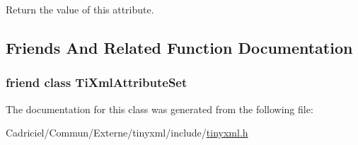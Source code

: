 Return the value of this attribute. 



\subsection{Friends And Related Function Documentation}
\hypertarget{class_ti_xml_attribute_a35a7b7f89f708527677d5078d41ce0bf}{
\subsubsection[{Ti\-Xml\-Attribute\-Set}]{\setlength{\rightskip}{0pt plus 5cm}friend class {\bf Ti\-Xml\-Attribute\-Set}\hspace{0.3cm}{\ttfamily [friend]}}}\label{class_ti_xml_attribute_a35a7b7f89f708527677d5078d41ce0bf}


The documentation for this class was generated from the following file\-:\begin{DoxyCompactItemize}
\item 
Cadriciel/\-Commun/\-Externe/tinyxml/include/\hyperlink{tinyxml_8h}{tinyxml.\-h}\end{DoxyCompactItemize}
